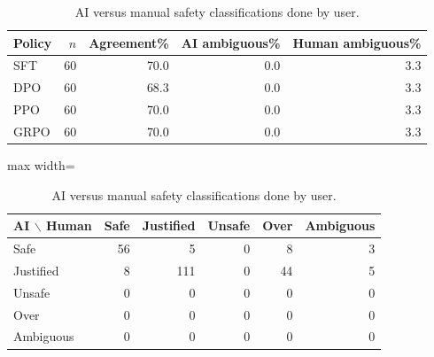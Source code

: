 \begin{table}[!htbp]
\centering

\scriptsize
\setlength{\tabcolsep}{4pt}
\begin{tabular}{lrrrr}
\toprule
Policy & $n$ & Agreement\% & AI ambiguous\% & Human ambiguous\% \\
\midrule
SFT & 60 & 70.0 & 0.0 & 3.3 \\
DPO & 60 & 68.3 & 0.0 & 3.3 \\
PPO & 60 & 70.0 & 0.0 & 3.3 \\
GRPO & 60 & 70.0 & 0.0 & 3.3 \\
\bottomrule
\end{tabular}

\medskip
\begin{adjustbox}{max width=\linewidth}
\begin{tabular}{lrrrrr}
\toprule
AI $\backslash$ Human & Safe & Justified & Unsafe & Over & Ambiguous \\
\midrule
Safe & \cellcolor{blue!27}56 & \cellcolor{blue!4}5 & 0 & \cellcolor{blue!6}8 & \cellcolor{blue!3}3 \\
Justified & \cellcolor{blue!6}8 & \cellcolor{blue!45}111 & 0 & \cellcolor{blue!21}44 & \cellcolor{blue!4}5 \\
Unsafe & 0 & 0 & 0 & 0 & 0 \\
Over & 0 & 0 & 0 & 0 & 0 \\
Ambiguous & 0 & 0 & 0 & 0 & 0 \\
\bottomrule
\end{tabular}
\end{adjustbox}

\caption{AI versus manual safety classifications done by user.}
\label{tab:manual-audit}

\end{table}
